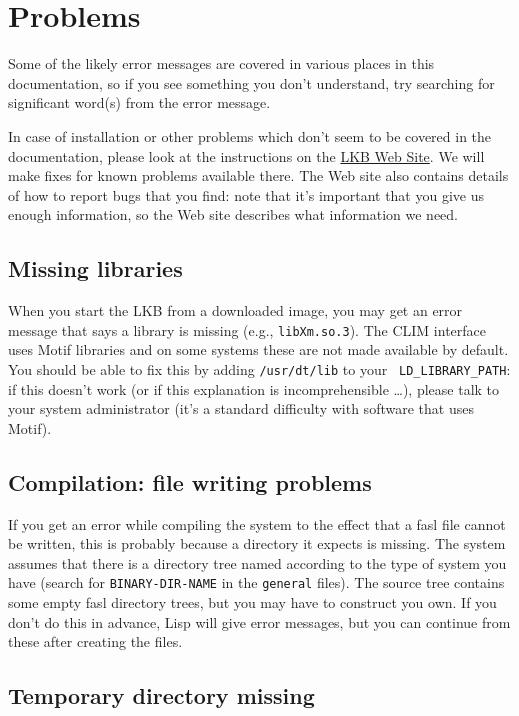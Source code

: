 \documentclass[12pt]{report}
\begin{document}
\section{Problems}
\label{problems}

Some of the likely error messages are covered in various places in this
documentation, so if you see something you don't understand, try searching for
significant word(s) from the error message.

In case of installation or other problems which don't seem to be covered in the
documentation, please look at the instructions on the
\href{http://www-csli.stanford.edu/~aac/lkb.html}{LKB Web Site}.  We will make
fixes for known problems available there.  The Web site also contains details
of how to report bugs that you find: note that it's important that you give us
enough information, so the Web site describes what information we need.

\subsection{Missing libraries}

When you start the LKB from a downloaded image, you may get an error message that
says a library is missing (e.g., {\tt libXm.so.3}).  The CLIM interface uses
Motif libraries and on some systems these are not made available by default.
You should be able to fix this by adding {\tt /usr/dt/lib} to your {\tt
LD\_LIBRARY\_PATH}: if this doesn't work (or if this explanation is
incomprehensible \ldots), please talk to your system administrator (it's a
standard difficulty with software that uses Motif).

\subsection{Compilation: file writing problems}

If you get an error while compiling the system to the effect that
a fasl file cannot be written, this is probably because a directory it
expects is missing.
The system assumes that there
is a directory tree named according to the type of system you have
(search for {\tt BINARY-DIR-NAME} in the {\tt general} files).
The source tree contains some empty fasl directory trees, but you
may have to construct you own.
If you don't do this in advance, Lisp will give error messages, but
you can continue from these after creating the files.


\subsection{Temporary directory missing}
\end{document}
